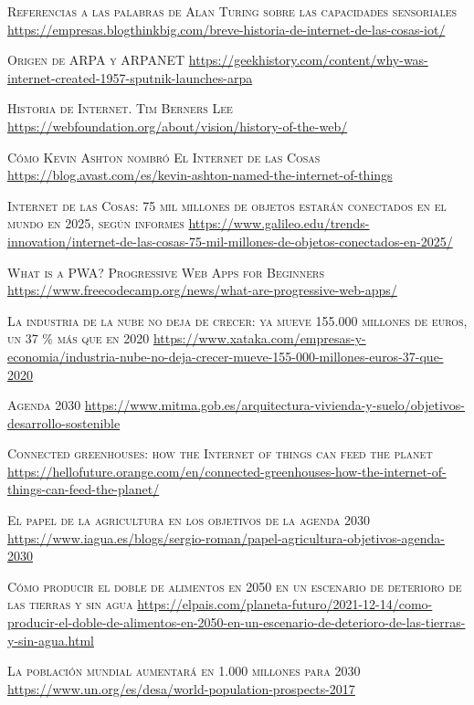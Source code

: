 \documentclass[a4paper, 12pt, oneside]{book}
\begin{document}
\begin{thebibliography}{X}
 \textsc{Referencias a las palabras de Alan Turing sobre las capacidades sensoriales}
\url{https://empresas.blogthinkbig.com/breve-historia-de-internet-de-las-cosas-iot/}

 \textsc{Origen de ARPA y ARPANET}
\url{https://geekhistory.com/content/why-was-internet-created-1957-sputnik-launches-arpa}

 \textsc{Historia de Internet. Tim Berners Lee}
\url{https://webfoundation.org/about/vision/history-of-the-web/}

 \textsc{Cómo Kevin Ashton nombró El Internet de las Cosas}
\url{https://blog.avast.com/es/kevin-ashton-named-the-internet-of-things}

 \textsc{Internet de las Cosas: 75 mil millones de objetos estarán conectados en el mundo en 2025, según informes}
\url{https://www.galileo.edu/trends-innovation/internet-de-las-cosas-75-mil-millones-de-objetos-conectados-en-2025/}

 \textsc{What is a PWA? Progressive Web Apps for Beginners}
\url{https://www.freecodecamp.org/news/what-are-progressive-web-apps/}

 \textsc{La industria de la nube no deja de crecer: ya mueve 155.000 millones de euros, un 37 \% más que en 2020}
\url{https://www.xataka.com/empresas-y-economia/industria-nube-no-deja-crecer-mueve-155-000-millones-euros-37-que-2020}

 \textsc{Agenda 2030}
\url{https://www.mitma.gob.es/arquitectura-vivienda-y-suelo/objetivos-desarrollo-sostenible}

\textsc{Connected greenhouses: how the Internet of things can feed the planet}
\url{https://hellofuture.orange.com/en/connected-greenhouses-how-the-internet-of-things-can-feed-the-planet/}

\textsc{El papel de la agricultura en los objetivos de la agenda 2030}
\url{https://www.iagua.es/blogs/sergio-roman/papel-agricultura-objetivos-agenda-2030}

\textsc{Cómo producir el doble de alimentos en 2050 en un escenario de deterioro de las tierras y sin agua}
\url{https://elpais.com/planeta-futuro/2021-12-14/como-producir-el-doble-de-alimentos-en-2050-en-un-escenario-de-deterioro-de-las-tierras-y-sin-agua.html}

\textsc{La población mundial aumentará en 1.000 millones para 2030}
\url{https://www.un.org/es/desa/world-population-prospects-2017}


\end{thebibliography}
\end{document}
